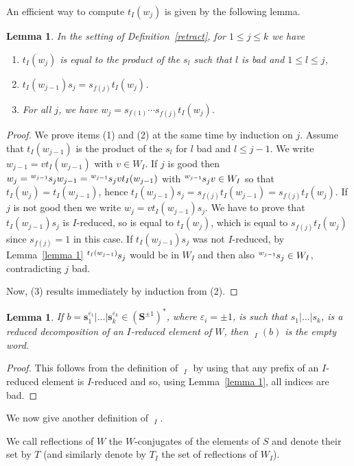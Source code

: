 \documentclass{amsart}
\numberwithin{equation}{section}
\newtheorem{lemma}[equation]{Lemma}
\newcommand\ve{\varepsilon}
\newcommand\lexp[2]{\kern\scriptspace\vphantom{#2}^{#1}\kern-\scriptspace#2}
\newcommand\bs{{\mathbf s}}
\newcommand\bS{{\mathbf S}}
\DeclareMathOperator\hpi{\hat\pi}
\begin{document}
An efficient way to compute $t_I(w_j)$ is given by the following lemma.
\begin{lemma}\label{not good} In the setting of Definition~\ref{retract}, for $1\le j\le k$
we have
\begin{enumerate}
\item $t_I(w_j)$ is equal to the product of the
$s_l$ such that $l$ is bad and $1\le l\le j$,  
\item  $t_I(w_{j-1})s_j=s_{f(j)}t_I(w_j)$.
\item  For all $j$, we have $w_j = s_{f(1)}\cdots s_{f(j)}t_I(w_j)$.
\end{enumerate}
\end{lemma}
\begin{proof}
 We prove items (1) and (2) at the same time by induction on $j$.  Assume that $t_I(w_{j-1})$
is the product of the $s_l$ for $l$ bad and $l\le j-1$. We write $w_{j-1}=v
t_I(w_{j-1})$ with $v\in W_I$. If $j$ is good then $w_j=\lexp{w_{j-1}}s_j
w_{j-1}=\lexp{w_{j-1}}s_j vt_I(w_{j-1})$ with $\lexp{w_{j-1}}s_j v\in W_I$
so that $t_I(w_j)=t_I(w_{j-1})$, hence
$t_I(w_{j-1})s_j=s_{f(j)}t_I(w_{j-1})=s_{f(j)}t_I(w_j)$. If $j$ is not
good then we write $w_j=v t_I(w_{j-1})s_j$. We have to prove that
$t_I(w_{j-1})s_j$ is $I$-reduced, so is equal to $t_I(w_j)$, which is equal to
$s_{f(j)}t_I(w_j)$ since $s_{f(j)}=1$ in this case. 
If $t_I(w_{j-1})s_j$ was not $I$-reduced,
by Lemma~\ref{lemma 1} $\lexp{t_I(w_{j-1})}s_j$ would be in $W_I$ and then
also $\lexp{w_{j-1}}s_j\in W_I$, contradicting $j$ bad.

Now, (3) results immediately by induction from (2).
\end{proof}
\begin{lemma}\label{pi_I(reduced)}
If $b=\bs_1^{\ve_1}|\ldots|\bs_k^{\ve_k}\in(\bS^{\pm1})^*$,
where $\ve_i=\pm 1$, is such that  $s_1|\ldots|s_k$,
is  a reduced decomposition of an $I$-reduced element of
$W$, then $\hpi_I(b)$ is the empty word.
\end{lemma}
\begin{proof}
This follows from the definition of $\hpi_I$ by using that any prefix of an
$I$-reduced element is $I$-reduced and so, using Lemma~\ref{lemma 1},
all indices are bad.
\end{proof}
We  now give another definition of  $\hpi_I$. 

We call reflections of $W$  the $W$-conjugates of the
elements of $S$ and denote their set by $T$ (and similarly denote by $T_I$ the
set of reflections of $W_I$).
\end{document}
